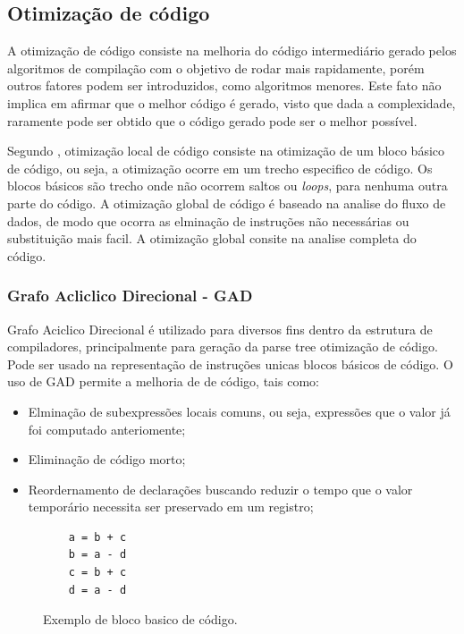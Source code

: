 \subsection{Otimização de código}
\par
A otimização de código consiste na melhoria do código intermediário gerado pelos algoritmos de compilação com o objetivo de rodar mais rapidamente, porém outros fatores podem ser introduzidos, como algoritmos menores. Este fato não implica em afirmar que o melhor código é gerado, visto que dada a complexidade, raramente pode ser obtido que o código gerado pode ser o melhor possível\cite{aho2007compilers}.

\par
Segundo \cite{aho2007compilers}, otimização local de código consiste na otimização de um bloco básico de código, ou seja, a otimização ocorre em um trecho especifico de código. Os blocos básicos são trecho onde não ocorrem saltos ou \textit{loops}, para nenhuma outra parte do código. A otimização global de código é baseado na analise do fluxo de dados, de modo que ocorra as elminação de instruções não necessárias ou substituição mais facil. A otimização global consite na analise completa do código.

\subsubsection{Grafo Acliclico Direcional - GAD}
\par
Grafo Aciclico Direcional é utilizado para diversos fins dentro da estrutura de compiladores, principalmente para geração da parse tree otimização de código. Pode ser usado na representação de instruções unicas blocos básicos de código\cite{aho2007compilers}. O uso de GAD permite a melhoria de de código, tais como:
\begin{itemize}
\item Elminação de subexpressões locais comuns, ou seja, expressões que o valor já foi computado anteriomente;
\item Eliminação de código morto;
\item  Reordernamento de declarações buscando reduzir o tempo que o valor temporário necessita ser preservado em um registro;
\end{itemize}

\par
\begin{figure}[thp]
\caption{\label{fig:basic_block} Exemplo de bloco basico de código.}
	\begin{center}
    \begin{minipage}{0.9\textwidth}
    \begin{lstlisting}
    a = b + c
    b = a - d
    c = b + c
    d = a - d
	\end{lstlisting}
    \end{minipage}
	\end{center}
\end{figure}

